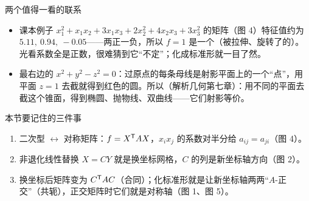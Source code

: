 \documentclass[11pt,a4paper,oneside,openany,fontset=none]{ctexbook}
\begin{document}
\begin{intbox}{两个值得一看的联系}
\begin{itemize}
\item 课本例子 $x_1^2+x_1x_2+3x_1x_3+2x_2^2+4x_2x_3+3x_3^2$ 的矩阵（图 4）特征值约为 $5.11,\ 0.94,\ -0.05$——两正一负，所以 $f=1$ 是一个（被拉伸、旋转了的）。光看系数全是正数，很难猜到它“不定”；化成标准形就一目了然。
\item 最右边的 $x^2+y^2-z^2=0$：过原点的每条母线是射影平面上的一个“点”，用平面 $z=1$ 去截就得到红色的圆。所以（解析几何第七章）：用不同的平面去截这个锥面，得到椭圆、抛物线、双曲线——它们射影等价。
\end{itemize}
\end{intbox}

\begin{ckbox}{本节要记住的三件事}
\begin{enumerate}
\item 二次型 $\leftrightarrow$ 对称矩阵：$f=X^{\mathsf T} AX$，$x_ix_j$ 的系数对半分给 $a_{ij}=a_{ji}$（图 4）。
\item 非退化线性替换 $X=CY$ 就是换坐标网格，$C$ 的列是新坐标轴方向（图 2）。
\item 换坐标后矩阵变为 $C^{\mathsf T} AC$（合同）；化标准形就是让新坐标轴两两“$A$-正交”（共轭），正交矩阵时它们就是对称轴（图 1、图 5）。
\end{enumerate}
\end{ckbox}
\end{document}
